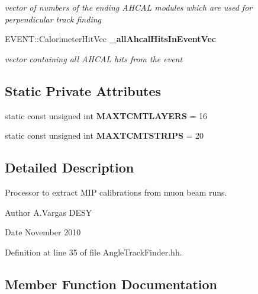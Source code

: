 \begin{DoxyCompactItemize}
\begin{DoxyCompactList}\small\item\em vector of numbers of the ending AHCAL modules which are used for perpendicular track finding \item\end{DoxyCompactList}\item 
EVENT::CalorimeterHitVec {\bf \_\-allAhcalHitsInEventVec}\label{classCALICE_1_1AngleTrackFinder_aef20f858c612a3181537606fdc4be0f1}

\begin{DoxyCompactList}\small\item\em vector containing all AHCAL hits from the event \item\end{DoxyCompactList}\end{DoxyCompactItemize}
\subsection*{Static Private Attributes}
\begin{DoxyCompactItemize}
\item 
static const unsigned int {\bfseries MAXTCMTLAYERS} = 16\label{classCALICE_1_1AngleTrackFinder_a42ed04f962d4a3564dbcb4811cd4f21b}

\item 
static const unsigned int {\bfseries MAXTCMTSTRIPS} = 20\label{classCALICE_1_1AngleTrackFinder_ad99874d9a4bd40c23336a9740c34bb23}

\end{DoxyCompactItemize}


\subsection{Detailed Description}
Processor to extract MIP calibrations from muon beam runs. \begin{DoxyAuthor}{Author}
A.Vargas DESY 
\end{DoxyAuthor}
\begin{DoxyDate}{Date}
November 2010 
\end{DoxyDate}


Definition at line 35 of file AngleTrackFinder.hh.

\subsection{Member Function Documentation}
